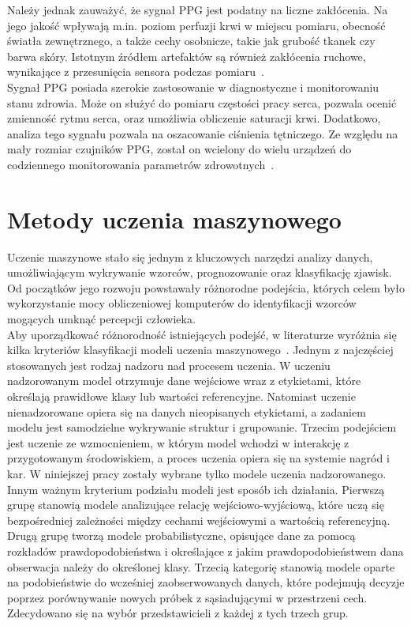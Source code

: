 \documentclass[a4paper,twoside,12pt]{book}
\begin{document}
Należy jednak zauważyć, że sygnał PPG jest podatny na liczne zakłócenia. Na jego jakość wpływają m.in. poziom perfuzji krwi w miejscu pomiaru, obecność światła zewnętrznego, a także cechy osobnicze, takie jak grubość tkanek czy barwa skóry. Istotnym źródłem artefaktów są również zakłócenia ruchowe, wynikające z przesunięcia sensora podczas pomiaru~\cite{Sieczkowski2020}.\\

Sygnał PPG posiada szerokie zastosowanie w diagnostyczne i monitorowaniu stanu zdrowia. Może on służyć do pomiaru częstości pracy serca, pozwala ocenić zmienność rytmu serca, oraz umożliwia obliczenie saturacji krwi. Dodatkowo, analiza tego sygnału pozwala na oszacowanie ciśnienia tętniczego. Ze względu na mały rozmiar czujników PPG, został on wcielony do wielu urządzeń do codziennego monitorowania parametrów zdrowotnych~\cite{allen2024advances}.

\chapter{Metody uczenia maszynowego}

Uczenie maszynowe stało się jednym z kluczowych narzędzi analizy danych, umożliwiającym wykrywanie wzorców, prognozowanie oraz klasyfikację zjawisk. Od początków jego rozwoju powstawały różnorodne podejścia, których celem było wykorzystanie mocy obliczeniowej komputerów do identyfikacji wzorców mogących umknąć percepcji człowieka.\\

Aby uporządkować różnorodność istniejących podejść, w literaturze wyróżnia się kilka kryteriów klasyfikacji modeli uczenia maszynowego~\cite{Sarker2021DeepLearning}. Jednym z najczęściej stosowanych jest rodzaj nadzoru nad procesem uczenia. W uczeniu nadzorowanym model otrzymuje dane wejściowe wraz z etykietami, które określają prawidłowe klasy lub wartości referencyjne. Natomiast uczenie nienadzorowane opiera się na danych nieopisanych etykietami, a zadaniem modelu jest samodzielne wykrywanie struktur i grupowanie. Trzecim podejściem jest uczenie ze wzmocnieniem, w którym model wchodzi w interakcję z przygotowanym środowiskiem, a proces uczenia opiera się na systemie nagród i kar. W niniejszej pracy zostały wybrane tylko modele uczenia nadzorowanego.\\

Innym ważnym kryterium podziału modeli jest sposób ich działania. Pierwszą grupę stanowią modele analizujące relację wejściowo-wyjściową, które uczą się bezpośredniej zależności między cechami wejściowymi a wartością referencyjną. Drugą grupę tworzą modele probabilistyczne, opisujące dane za pomocą rozkładów prawdopodobieństwa i określające z jakim prawdopodobieństwem dana obserwacja należy do określonej klasy. Trzecią kategorię stanowią modele oparte na podobieństwie do wcześniej zaobserwowanych danych, które podejmują decyzje poprzez porównywanie nowych próbek z sąsiadującymi w przestrzeni cech. Zdecydowano się na wybór przedstawicieli z każdej z tych trzech grup.\\
\end{document}
